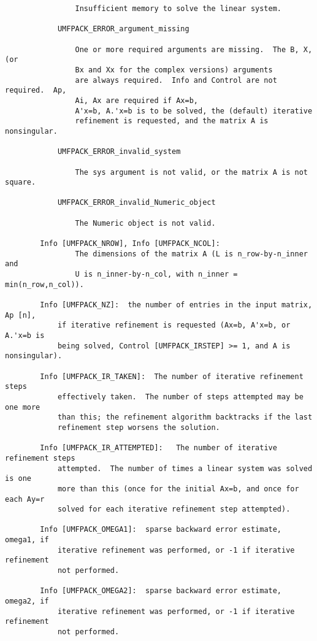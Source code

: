 \documentclass[11pt]{article}
\begin{document}
{\begin{verbatim}
                Insufficient memory to solve the linear system.

            UMFPACK_ERROR_argument_missing

                One or more required arguments are missing.  The B, X, (or
                Bx and Xx for the complex versions) arguments
                are always required.  Info and Control are not required.  Ap,
                Ai, Ax are required if Ax=b,
                A'x=b, A.'x=b is to be solved, the (default) iterative
                refinement is requested, and the matrix A is nonsingular.

            UMFPACK_ERROR_invalid_system

                The sys argument is not valid, or the matrix A is not square.

            UMFPACK_ERROR_invalid_Numeric_object

                The Numeric object is not valid.

        Info [UMFPACK_NROW], Info [UMFPACK_NCOL]:
                The dimensions of the matrix A (L is n_row-by-n_inner and
                U is n_inner-by-n_col, with n_inner = min(n_row,n_col)).

        Info [UMFPACK_NZ]:  the number of entries in the input matrix, Ap [n],
            if iterative refinement is requested (Ax=b, A'x=b, or A.'x=b is
            being solved, Control [UMFPACK_IRSTEP] >= 1, and A is nonsingular).

        Info [UMFPACK_IR_TAKEN]:  The number of iterative refinement steps
            effectively taken.  The number of steps attempted may be one more
            than this; the refinement algorithm backtracks if the last
            refinement step worsens the solution.

        Info [UMFPACK_IR_ATTEMPTED]:   The number of iterative refinement steps
            attempted.  The number of times a linear system was solved is one
            more than this (once for the initial Ax=b, and once for each Ay=r
            solved for each iterative refinement step attempted).

        Info [UMFPACK_OMEGA1]:  sparse backward error estimate, omega1, if
            iterative refinement was performed, or -1 if iterative refinement
            not performed.

        Info [UMFPACK_OMEGA2]:  sparse backward error estimate, omega2, if
            iterative refinement was performed, or -1 if iterative refinement
            not performed.


\end{verbatim}}
\end{document}
